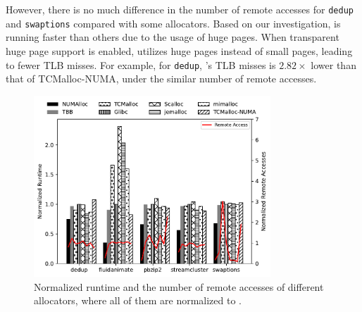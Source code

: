 However, there is no much difference in the number of remote accesses for \texttt{dedup} and \texttt{swaptions} compared with some allocators. Based on our investigation, \NM{} is running faster than others due to the usage of huge pages. When transparent huge page support is enabled, \NM{} utilizes huge pages instead of small pages, leading to fewer TLB misses. For example, for \texttt{dedup}, \NM{}'s TLB misses is $2.82\times$ lower than that of TCMalloc-NUMA, under the similar number of remote accesses.


\begin{figure}[!h]
    \centering
    \includegraphics[width=3.5in]{figure/remote-access.pdf}
    \caption{Normalized runtime and the number of remote accesses of different allocators, where all of them are normalized to \NM{}. }
    \label{fig:remoteAccess}
\end{figure}

